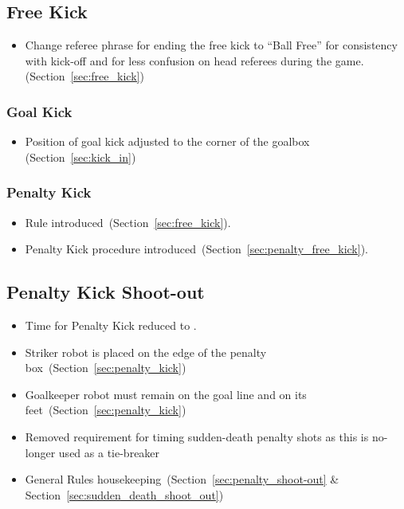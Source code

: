 \subsection*{Free Kick}
\begin{itemize}
  \item Change referee phrase for ending the free kick to ``Ball Free'' for consistency with kick-off and for less confusion on  head referees during the game.(\cf Section~\ref{sec:free_kick})
\end{itemize}

\subsubsection*{Goal Kick}
\begin{itemize}
  \item Position of goal kick adjusted to the corner of the goalbox (\cf Section~\ref{sec:kick_in})
\end{itemize}

\subsubsection*{Penalty Kick}
\begin{itemize}
  \item Rule introduced~(\cf Section~\ref{sec:free_kick}).
  \item Penalty Kick procedure introduced~(\cf Section~\ref{sec:penalty_free_kick}).
\end{itemize}

\subsection*{Penalty Kick Shoot-out}
\begin{itemize}
  \item Time for Penalty Kick reduced to \PenaltyKickTime.
  \item Striker robot is placed on the edge of the penalty box~(\cf Section~\ref{sec:penalty_kick})
  \item Goalkeeper robot must remain on the goal line and on its feet~(\cf Section~\ref{sec:penalty_kick})
  \item Removed requirement for timing sudden-death penalty shots as this is no-longer used as a tie-breaker
  \item General Rules housekeeping~(\cf Section~\ref{sec:penalty_shoot-out} \& Section~\ref{sec:sudden_death_shoot_out})
\end{itemize}

